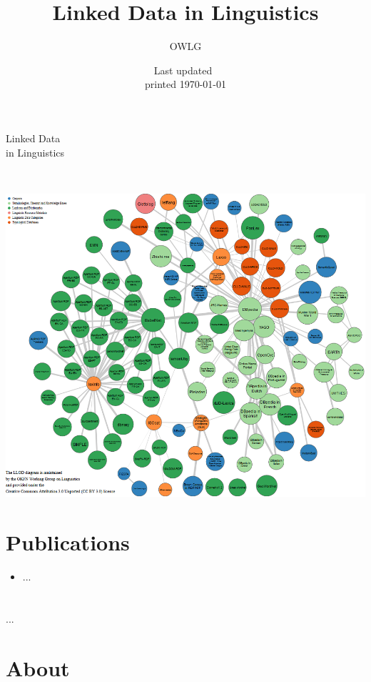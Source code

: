 \documentclass[
notumble,
nofoldmark,
]{leaflet}
\title{Linked Data in Linguistics}
\author{%
  OWLG}
\date{Last updated~\docdate\\printed \today}
\begin{document}
%
\thispagestyle{empty}
 
 

\vspace*{12cm}

\hspace*{-6mm}
\parbox{\textwidth}{
\sffamily
\parbox{\textwidth}{\Huge Linked Data \\ in Linguistics}\\ 
}
 

\newpage %
\includegraphics[width=2\textwidth]{llod-cloud.png}
\section{Publications}
\begin{itemize}
\item ...
\end{itemize} 

\newpage %
\vspace*{12.35cm} 
 \section{} %
 \parbox{\textwidth}{
...
 }

\newpage  %

\section{About}
\end{document}
